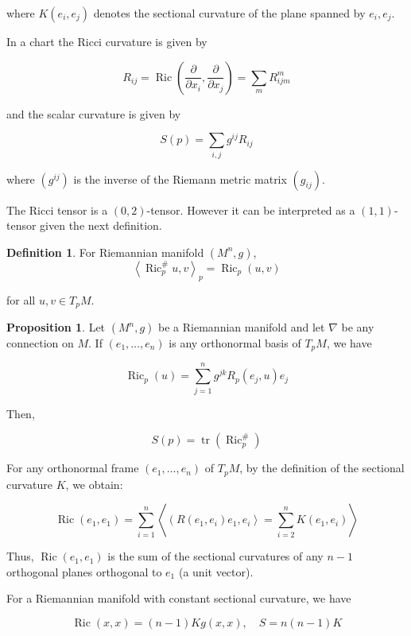 \documentclass{Dissertate}
\theoremstyle{definition}
\newtheorem{proposition}[theorem]{Proposition}
\theoremstyle{definition} %
\theoremstyle{definition}
\newtheorem{definition}[theorem]{Definition}
\begin{document}
where $K\left(e_{i}, e_{j}\right)$ denotes the sectional curvature of the plane spanned by $e_{i}, e_{j}$.

In a chart the Ricci curvature is given by

$$
R_{i j}=\operatorname{Ric}\left(\frac{\partial}{\partial x_{i}}, \frac{\partial}{\partial x_{j}}\right)=\sum_{m} R_{i j m}^{m}
$$

and the scalar curvature is given by

$$
S(p)=\sum_{i, j} g^{i j} R_{i j}
$$

where $\left(g^{i j}\right)$ is the inverse of the Riemann metric matrix $\left(g_{i j}\right)$. 

The Ricci tensor is a $(0,2)$-tensor. However it can be interpreted as a $(1,1)$-tensor given the next definition.

\begin{definition}
For Riemannian manifold $(M^n, g)$,
$$
\left\langle\operatorname{Ric}_{p}^{\#} u, v\right\rangle_{p}=\operatorname{Ric}_{p}(u, v)
$$

for all $u, v \in T_{p} M$.
\end{definition}

\begin{proposition}
Let $(M^n, g)$ be a Riemannian manifold and let $\nabla$ be any connection on $M$. If $\left(e_{1}, \ldots, e_{n}\right)$ is any orthonormal basis of $T_{p} M$, we have

$$
\operatorname{Ric}_{p}(u)=\sum_{j=1}^{n} g^{jk} R_{p}\left(e_{j}, u\right) e_{j}
$$

Then, 

$$
S(p)=\operatorname{tr}\left(\operatorname{Ric}_{p}^{\#}\right)
$$
\end{proposition}

For any orthonormal frame $\left(e_{1}, \ldots, e_{n}\right)$ of $T_{p} M$, by the definition of the sectional curvature $K$, we obtain:

$$
\operatorname{Ric}\left(e_{1}, e_{1}\right)=\sum_{i=1}^{n}\left\langle\left(R\left(e_{1}, e_{i}\right) e_{1}, e_{i}\right\rangle=\sum_{i=2}^{n} K\left(e_{1}, e_{i}\right)\right \rangle
$$

Thus, $\operatorname{Ric}\left(e_{1}, e_{1}\right)$ is the sum of the sectional curvatures of any $n-1$ orthogonal planes orthogonal to $e_{1}$ (a unit vector).

For a Riemannian manifold with constant sectional curvature, we have

$$
\operatorname{Ric}(x, x)=(n-1) K g(x, x), \quad S=n(n-1) K
$$
\end{document}
